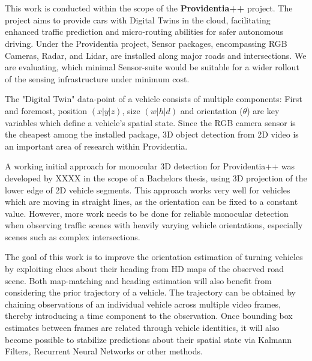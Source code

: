 \documentclass[RAIstudentexpose%
              ,optBiber%
              ,optBibstyleAlphabetic%
              ,optEnglish%
              ]{RAIlatex}%
\begin{document}
%

%

\section{}

This work is conducted within the scope of the \textbf{Providentia++} project. The project aims to provide cars with Digital Twins in the cloud, facilitating enhanced traffic prediction and micro-routing abilities for safer autonomous driving. Under the Providentia project, Sensor packages, encompassing RGB Cameras, Radar, and Lidar, are installed along major roads and intersections. We are evaluating, which minimal Sensor-suite would be suitable for a wider rollout of the sensing infrastructure under minimum cost. 

The "Digital Twin" data-point of a vehicle consists of multiple components: First and foremost, position $\left(x|y|z\right)$, size $\left(w|h|d\right)$ and orientation ($\theta$) are key variables which define a vehicle's spatial state. Since the RGB camera sensor is the cheapest among the installed package, 3D object detection from 2D video is an important area of research within Providentia.

A working initial approach for monocular 3D detection for Providentia++ was developed by XXXX in the scope of a Bachelors thesis, using 3D projection of the lower edge of 2D vehicle segments. This approach works very well for vehicles which are moving in straight lines, as the orientation can be fixed to a constant value. However, more work needs to be done for reliable monocular detection when observing traffic scenes with heavily varying vehicle orientations, especially scenes such as complex intersections.

The goal of this work is to improve the orientation estimation of turning vehicles by exploiting clues about their heading from HD maps of the observed road scene. Both map-matching and heading estimation will also benefit from considering the prior trajectory of a vehicle. The trajectory can be obtained by chaining observations of an individual vehicle across multiple video frames, thereby introducing a time component to the observation. Once bounding box estimates between frames are related through vehicle identities, it will also become possible to stabilize predictions about their spatial state via Kalmann Filters, Recurrent Neural Networks or other methods.
\end{document}
